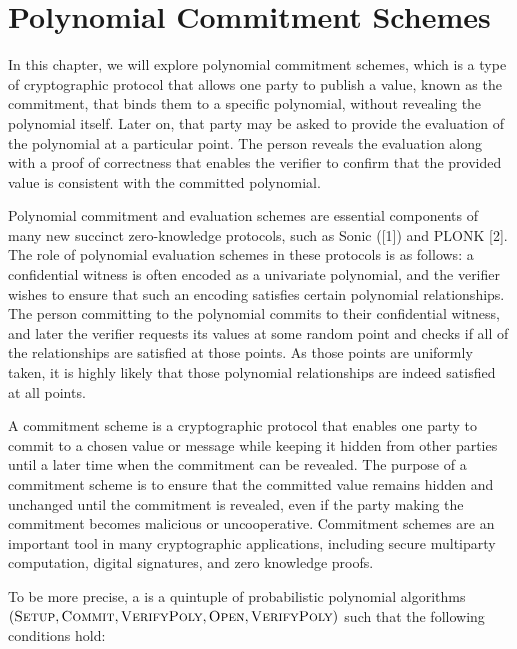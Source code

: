 \chapter{Polynomial Commitment Schemes}\label{chap:poly-commitments}
In this chapter, we will explore polynomial commitment schemes, which is a type of cryptographic protocol that allows one party to publish a value, known as the commitment, that binds them to a specific polynomial, without revealing the polynomial itself. Later on, that party may be asked to provide the evaluation of the polynomial at a particular point. The person reveals the evaluation along with a proof of correctness that enables the verifier to confirm that the provided value is consistent with the committed polynomial.



Polynomial commitment and evaluation schemes are essential components of many new succinct zero-knowledge protocols, such as Sonic ([1]) and PLONK [2]. The role of polynomial evaluation schemes in these protocols is as follows: a confidential witness is often encoded as a univariate polynomial, and the verifier wishes to ensure that such an encoding satisfies certain polynomial relationships. The person committing to the polynomial commits to their confidential witness, and later the verifier requests its values at some random point and checks if all of the relationships are satisfied at those points. As those points are uniformly taken, it is highly likely that those polynomial relationships are indeed satisfied at all points.


A commitment scheme is a cryptographic protocol that enables one party to commit to a chosen value or message while keeping it hidden from other parties until a later time when the commitment can be revealed. The purpose of a commitment scheme is to ensure that the committed value remains hidden and unchanged until the commitment is revealed, even if the party making the commitment becomes malicious or uncooperative. Commitment schemes are an important tool in many cryptographic applications, including secure multiparty computation, digital signatures, and zero knowledge proofs.

To be more precise, a  is a quintuple of probabilistic polynomial algorithms $(\textsc{Setup},\textsc{Commit},\textsc{VerifyPoly},\textsc{Open}, \textsc{VerifyPoly})$ such that the following conditions hold:

